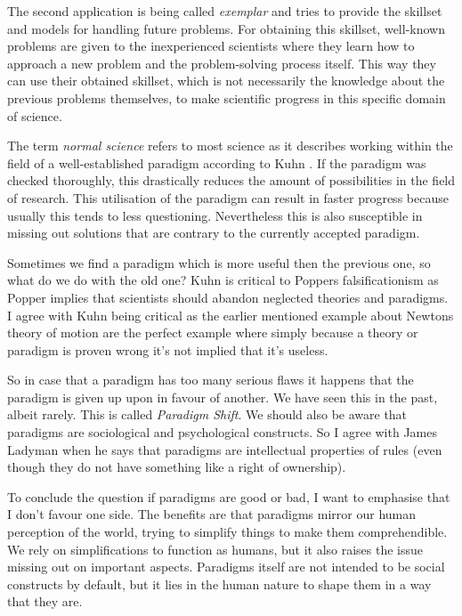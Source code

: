 \documentclass[11pt]{scrartcl}
\begin{document}
The second application is being called \textit{exemplar} and tries to provide the skillset and models for handling future problems. For obtaining this skillset, well-known problems are given to the inexperienced scientists where they learn how to approach a new problem and the problem-solving process itself. This way they can use their obtained skillset, which is not necessarily the knowledge about the previous problems themselves, to make scientific progress in this specific domain of science.

The term \textit{normal science} refers to most science as it describes working within the field of a well-established paradigm according to Kuhn \cite[p. 100]{ladyman}. If the paradigm was checked thoroughly, this drastically reduces the amount of possibilities in the field of research. This utilisation of the paradigm can result in faster progress because usually this tends to less questioning. Nevertheless this is also susceptible in missing out solutions that are contrary to the currently accepted paradigm.

Sometimes we find a paradigm which is more useful then the previous one, so what do we do with the old one? Kuhn is critical to Poppers falsificationism \cite[p. 101]{ladyman} as Popper implies that scientists should abandon neglected theories and paradigms. I agree with Kuhn being critical as the earlier mentioned example about Newtons theory of motion are the perfect example where simply because a theory or paradigm is proven wrong it's not implied that it's useless.

So in case that a paradigm has too many serious flaws it happens that the paradigm is given up upon in favour of another. We have seen this in the past, albeit rarely. This is called \textit{Paradigm Shift}. We should also be aware that paradigms are sociological and psychological constructs. So I agree with James Ladyman when he says that paradigms are intellectual properties of rules (even though they do not have something like a right of ownership).

To conclude the question if paradigms are good or bad, I want to emphasise that I don't favour one side. The benefits are that paradigms mirror our human perception of the world, trying to simplify things to make them comprehendible. We rely on simplifications to function as humans, but it also raises the issue missing out on important aspects. Paradigms itself are not intended to be social constructs by default, but it lies in the human nature to shape them in a way that they are.
\end{document}
